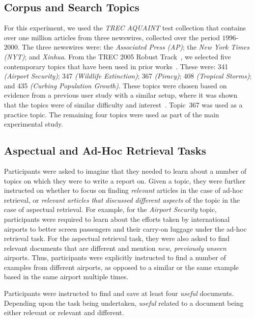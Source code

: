 \subsection{Corpus and Search Topics}\label{sec:method:corpus}
For this experiment, we used the \emph{TREC AQUAINT} test collection that contains over one million articles from three newswires, collected over the period $1996$-$2000$. The three newswires were: the \emph{Associated Press (AP)}; the \emph{New York Times (NYT)}; and \emph{Xinhua}.  From the TREC 2005 Robust Track~\cite{voorhees2006trec_robust}, we selected five contemporary topics that have been used in prior works~\cite{azzopardi2013query_cost,kelly2009query_suggestion,maxwell2017snippet_length}. These were: 341 \emph{(Airport Security)}; 347 \emph{(Wildlife Extinction)}; 367 \emph{(Piracy)}; 408 \emph{(Tropical Storms)}; and 435 \emph{(Curbing Population Growth)}. These topics were chosen based on evidence from a previous user study with a similar setup, where it was shown that the topics were of similar difficulty and interest~\cite{kelly2009query_suggestion}. Topic~367 was used as a practice topic. The remaining four topics were used as part of the main experimental study.

\subsection{Aspectual and Ad-Hoc Retrieval Tasks}
Participants were asked to imagine that they needed to learn about a number of topics on which they were to write a report on. Given a topic, they were further instructed on whether to focus on finding \emph{relevant} articles in the case of ad-hoc retrieval, or \emph{relevant articles that discussed different aspects} of the topic in the case of aspectual retrieval. For example, for the \emph{Airport Security} topic, participants were required to learn about the efforts taken by international airports to better screen passengers and their carry-on luggage under the ad-hoc retrieval task. For the aspectual retrieval task, they were also asked to find relevant documents that are different and mention \emph{new, previously unseen} airports. Thus, participants were explicitly instructed to find a number of examples from different airports, as opposed to a similar or the same example based in the same airport multiple times.

Participants were instructed to find and save at least four \emph{useful} documents. Depending upon the task being undertaken, \emph{useful} related to a document being either relevant or relevant and different.

